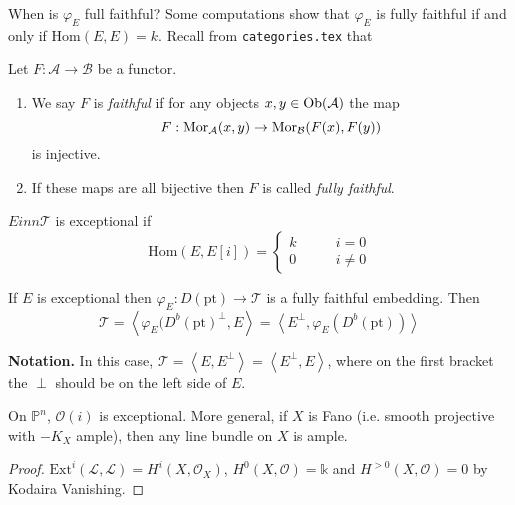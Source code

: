 When is $\varphi_E$ full faithful? Some computations show that $\varphi_E$ is
fully faithful if and only if $\text{Hom}(E,E)=k$. Recall from 
\texttt{categories.tex} that

\begin{definition}
\label{definition-faithful}
Let $F : \mathcal{A} \to \mathcal{B}$ be a functor.
\begin{enumerate}
\item We say $F$ is {\it faithful} if
for any objects $x, y \in \mathop{\mathrm{Ob}}\nolimits(\mathcal{A})$ the map
$$
F : \mathop{\mathrm{Mor}}\nolimits_\mathcal{A}(x, y) \to \mathop{\mathrm{Mor}}\nolimits_\mathcal{B}(F(x), F(y))
$$
is injective.
\item If these maps are all bijective then $F$ is called
{\it fully faithful}.
\end{enumerate}
\end{definition}

\medskip\noindent
\begin{definition}
\label{definition-exceptional-object}
$E inn \mathcal{T}$ is exceptional if 
$$
\text{Hom}(E,E[i])=
\begin{cases}
k\qquad &i=0 \\
0\qquad &i \neq 0
\end{cases}
$$
\end{definition}

\begin{lemma}
\label{lemma-exeptional-implies-fully-faithful}
If $E$ is exceptional then $\varphi_E:D(\text{pt}) \to \mathcal{T}$ is a fully
faithful embedding. Then
$$
\mathcal{T}=\left<\varphi_E(D^b(\text{pt})^\perp,E\right>=
\left<E^\perp,\varphi_E(D^b(\text{pt}))\right>
$$
\end{lemma}

{\bf Notation.} In this case,
$\mathcal{T}=\left<E,E^\perp\right>=\left<E^\perp,E\right>$, where on the first
bracket the $\perp$ should be on the left side of $E$.

\begin{example}
\label{example-all-line-bundles-are-exceptional-on-Fano}
On  $\mathbb{P}^n$, $\mathcal{O}(i)$ is exceptional. More general, if $X$ is
Fano (i.e. smooth projective with $-K_X$ ample), then any line bundle on  $X$ is
ample.
\end{example}

\begin{proof}
$\text{Ext}^i(\mathcal{L},\mathcal{L})=H^{i}(X,\mathcal{O}_X)$,
$H^{0}(X,\mathcal{O})=\mathbb{k}$ and $H^{>0}(X,\mathcal{O})=0$ by Kodaira
Vanishing.
\end{proof}

